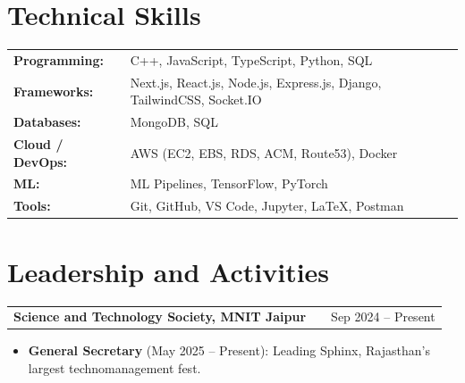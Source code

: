 \documentclass[a4paper,10pt]{article}
\begin{document}

\section{Technical Skills}

\color[HTML]{1C033C}

\begin{tabularx}{\linewidth}{@{}l X@{}}

\textbf{Programming:}    & C++, JavaScript, TypeScript, Python, SQL \\

\textbf{Frameworks:}     & Next.js, React.js, Node.js, Express.js, Django, TailwindCSS, Socket.IO \\

\textbf{Databases:}      & MongoDB, SQL \\

\textbf{Cloud / DevOps:} & AWS (EC2, EBS, RDS, ACM, Route53), Docker \\

\textbf{ML:}             & ML Pipelines, TensorFlow, PyTorch \\

\textbf{Tools:}          & Git, GitHub, VS Code, Jupyter, LaTeX, Postman \\

\end{tabularx}




\section{Leadership and Activities}

\begin{tabularx}{\linewidth}{ @{}l X r@{} }

\textbf{Science and Technology Society, MNIT Jaipur} & & \textcolor[HTML]{371e77}{Sep 2024 -- Present} \\

\end{tabularx}

\vspace{-8pt}

\begin{itemize}[nosep, leftmargin=1.5em, itemsep=0pt, topsep=0pt]

\item \textbf{General Secretary} \textcolor[HTML]{371e77}{(May 2025 -- Present):} Leading Sphinx, Rajasthan's largest technomanagement fest.

\end{itemize}
\end{document}
